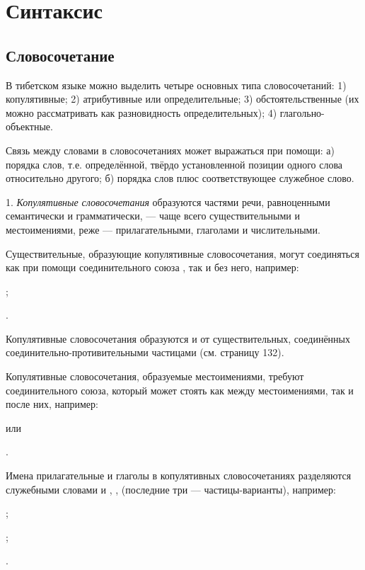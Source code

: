 \chapter{Синтаксис}

\section{Словосочетание}

В тибетском языке можно выделить четыре основных типа словосочетаний: 1) копулятивные; 2) атрибутивные или определительные; 3) обстоятельственные (их можно рассматривать как разновидность определительных); 4) глагольно-объектные.

Связь между словами в словосочетаниях может выражаться при помощи: а) порядка слов, т.е. определённой, твёрдо установленной позиции одного слова относительно другого; б) порядка слов плюс соответствующее служебное слово.

1. \emph{Копулятивные словосочетания} образуются частями речи, равноценными семантически и грамматически, --- чаще всего существительными и местоимениями, реже --- прилагательными, глаголами и числительными.

Существительные, образующие копулятивные словосочетания, могут соединяться как при помощи соединительного союза , так и без него, например:
\begin{prfsample}
	\item {};
	\item {}.
\end{prfsample}
Копулятивные словосочетания образуются и от существительных, соединённых соединительно-противительными частицами (см. страницу 132).

Копулятивные словосочетания, образуемые местоимениями, требуют соединительного союза, который может стоять как между местоимениями, так и после них, например:
\begin{prfsample}
	\item {} или
	\item {}.
\end{prfsample}

Имена прилагательные и глаголы в копулятивных словосочетаниях разделяются служебными словами  и , ,  (последние три --- частицы-варианты), например:
\begin{prfsample}
	\item {};
	\item {};
	\item {}.
\end{prfsample}

